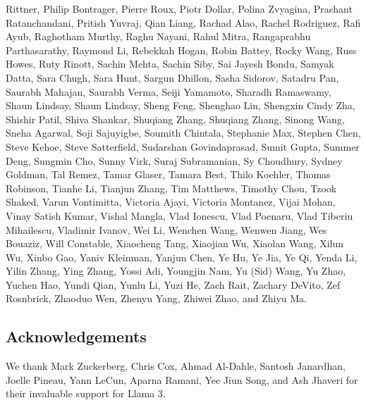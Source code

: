 Rittner, Philip Bontrager, Pierre Roux, Piotr Dollar, Polina Zvyagina, Prashant Ratanchandani, Pritish Yuvraj, Qian Liang, Rachad Alao, Rachel Rodriguez, Rafi Ayub, Raghotham Murthy, Raghu Nayani, Rahul Mitra, Rangaprabhu Parthasarathy, Raymond Li, Rebekkah Hogan, Robin Battey, Rocky Wang, Russ Howes, Ruty Rinott, Sachin Mehta, Sachin Siby, Sai Jayesh Bondu, Samyak Datta, Sara Chugh, Sara Hunt, Sargun Dhillon, Sasha Sidorov, Satadru Pan, Saurabh Mahajan, Saurabh Verma, Seiji Yamamoto, Sharadh Ramaswamy, Shaun Lindsay, Shaun Lindsay, Sheng Feng, Shenghao Lin, Shengxin Cindy Zha, Shishir Patil, Shiva Shankar, Shuqiang Zhang, Shuqiang Zhang, Sinong Wang, Sneha Agarwal, Soji Sajuyigbe, Soumith Chintala, Stephanie Max, Stephen Chen, Steve Kehoe, Steve Satterfield, Sudarshan Govindaprasad, Sumit Gupta, Summer Deng, Sungmin Cho, Sunny Virk, Suraj Subramanian, Sy Choudhury, Sydney Goldman, Tal Remez, Tamar Glaser, Tamara Best, Thilo Koehler, Thomas Robinson, Tianhe Li, Tianjun Zhang, Tim Matthews, Timothy Chou, Tzook Shaked, Varun Vontimitta, Victoria Ajayi, Victoria Montanez, Vijai Mohan, Vinay Satish Kumar, Vishal Mangla, Vlad Ionescu, Vlad Poenaru, Vlad Tiberiu Mihailescu, Vladimir Ivanov, Wei Li, Wenchen Wang, Wenwen Jiang, Wes Bouaziz, Will Constable, Xiaocheng Tang, Xiaojian Wu, Xiaolan Wang, Xilun Wu, Xinbo Gao, Yaniv Kleinman, Yanjun Chen, Ye Hu, Ye Jia, Ye Qi, Yenda Li, Yilin Zhang, Ying Zhang, Yossi Adi, Youngjin Nam, Yu (Sid) Wang, Yu Zhao, Yuchen Hao, Yundi Qian, Yunlu Li, Yuzi He, Zach Rait, Zachary DeVito, Zef Rosnbrick, Zhaoduo Wen, Zhenyu Yang, Zhiwei Zhao, and Zhiyu Ma.

\subsection*{Acknowledgements}
We thank Mark Zuckerberg, Chris Cox, Ahmad Al-Dahle, Santosh Janardhan, Joelle Pineau, Yann LeCun, Aparna Ramani, Yee Jiun Song, and Ash Jhaveri for their invaluable support for Llama 3.

